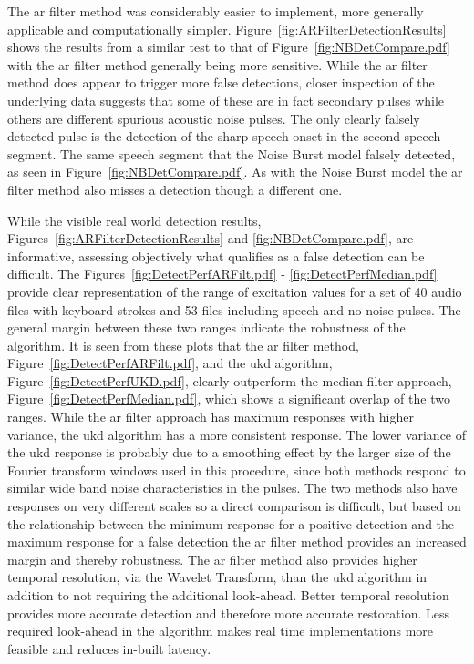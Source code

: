 The \gls{ar} filter method was considerably easier to implement, more generally applicable and computationally simpler. Figure~\ref{fig:ARFilterDetectionResults} shows the results from a similar test to that of Figure~\ref{fig:NBDetCompare.pdf} with the \gls{ar} filter method generally being more sensitive. While the \gls{ar} filter method does appear to trigger more false detections, closer inspection of the underlying data suggests that some of these are in fact secondary pulses while others are different spurious acoustic noise pulses. The only clearly falsely detected pulse is the detection of the sharp speech onset in the second speech segment. The same speech segment that the Noise Burst model falsely detected, as seen in Figure~\ref{fig:NBDetCompare.pdf}. As with the Noise Burst model the \gls{ar} filter method also misses a detection though a different one.

While the visible real world detection results, Figures~\ref{fig:ARFilterDetectionResults} and \ref{fig:NBDetCompare.pdf}, are informative, assessing objectively what qualifies as a false detection can be difficult. The Figures~\ref{fig:DetectPerfARFilt.pdf} - \ref{fig:DetectPerfMedian.pdf} provide clear representation of the range of excitation values for a set of 40 audio files with keyboard strokes and 53 files including speech and no noise pulses. The general margin between these two ranges indicate the robustness of the algorithm. It is seen from these plots that the \gls{ar} filter method, Figure~\ref{fig:DetectPerfARFilt.pdf}, and the \gls{ukd} algorithm, Figure~\ref{fig:DetectPerfUKD.pdf}, clearly outperform the median filter approach, Figure~\ref{fig:DetectPerfMedian.pdf}, which shows a significant overlap of the two ranges. While the \gls{ar} filter approach has maximum responses with higher variance, the \gls{ukd} algorithm has a more consistent response. The lower variance of the \gls{ukd} response is probably due to a smoothing effect by the larger size of the Fourier transform windows used in this procedure, since both methods respond to similar wide band noise characteristics in the pulses. The two methods also have responses on very different scales so a direct comparison is difficult, but based on the relationship between the minimum response for a positive detection and the maximum response for a false detection the \gls{ar} filter method provides an increased margin and thereby robustness. The \gls{ar} filter method also provides higher temporal resolution, via the Wavelet Transform, than the \gls{ukd} algorithm in addition to not requiring the additional look-ahead. Better temporal resolution provides more accurate detection and therefore more accurate restoration. Less required look-ahead in the algorithm makes real time implementations more feasible and reduces in-built latency.

